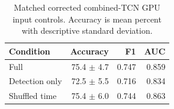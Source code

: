 \begin{table}[t]
\caption{Matched corrected combined-TCN GPU input controls. Accuracy is mean percent with descriptive standard deviation.}
\label{tab:controls}\centering
\begin{tabular}{lrrr}
\toprule
Condition & Accuracy & F1 & AUC\\
\midrule
Full & 75.4 $\pm$ 4.7 & 0.747 & 0.859\\
Detection only & 72.5 $\pm$ 5.5 & 0.716 & 0.834\\
Shuffled time & 75.4 $\pm$ 6.0 & 0.744 & 0.863\\
\bottomrule
\end{tabular}
\end{table}
